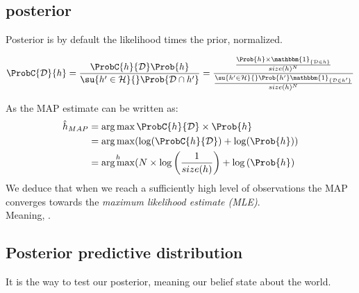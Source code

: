 \subsection{posterior}
Posterior is by default the likelihood times the prior, normalized.

\begin{center}
    $\ProbC{\mathcal{D}}{h} = \dfrac{\ProbC{h}{\mathcal{D}}\Prob{h}}{
        \su{{h'\in\mathcal{H}}}{}\Prob{\mathcal{D}\cap h'}
    } 
    = \dfrac{ \frac{\Prob{h}\times\mathbbm{1}_{\{\mathcal{D}\in h\}}}{size(h)^{N}}}{
        \frac{\su{{h'\in\mathcal{H}}}{}\Prob{h'}\mathbbm{1}_{\{\mathcal{D} \in h'\}}}{size(h)^{N}}
    }$
\end{center}

As the MAP estimate can be written as:
\begin{align*}
    \hat{h}_{MAP} &= \argmax \ProbC{h}{\mathcal{D}}\times \Prob{h} \\
                  &= \argmax (\log(\ProbC{h}{\mathcal{D}}) + \log(\Prob{h})) \\
                  &= \argmax^{h} (N\times\log\left(\frac{1}{size(h)}\right) +
                  \log \left(\Prob{h}\right)
\end{align*}
We deduce that when we reach a sufficiently high level of observations the MAP converges
towards the \emph{maximum likelihood estimate (MLE)}.\\
Meaning, .

\subsection{Posterior predictive distribution}
It is the way to test our posterior, meaning our belief state about the world. 
\begin{center}
\end{center}

